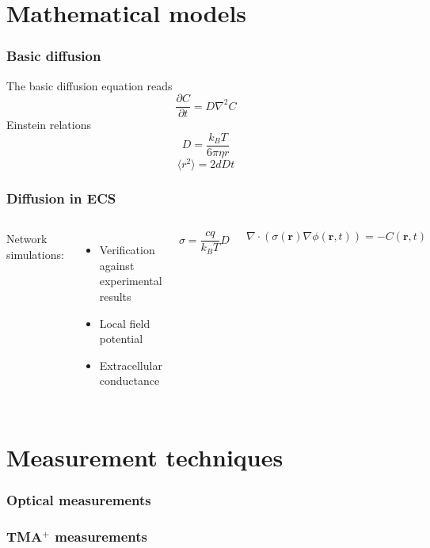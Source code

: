 \documentclass{beamer}
\renewcommand{\d}{\partial}
\begin{document}
\section{Mathematical models}

\begin{frame}
 \frametitle{Basic diffusion}
 The basic diffusion equation reads
 \begin{equation}
  \frac{\d C}{\d t} = D\nabla^2C
 \end{equation}
Einstein relations
\begin{equation}
 D = \frac{k_B T}{6\pi\eta r}
\end{equation}
\begin{equation}
 \langle r^2\rangle = 2dDt
\end{equation}
\end{frame}

\begin{frame}
 \frametitle{Diffusion in ECS}
\begin{columns} 
 \column{2.0in} 
 Network simulations: \\
 \begin{itemize}
  \item Verification against experimental results
  \item Local field potential
  \item Extracellular conductance
 \end{itemize}
 \begin{equation}
  \sigma = \frac{cq}{k_B T}D 
 \end{equation}
 
\column{2.0in}
\begin{equation*}
\nabla\cdot(\sigma(\mathbf{r})\nabla\phi(\mathbf{r},t)) = -C(\mathbf{r},t)
\end{equation*}

\end{columns}

\end{frame}


\section{Measurement techniques}
 \begin{frame}
 \frametitle{Optical measurements}
\end{frame}

 \begin{frame}
 \frametitle{TMA$^+$ measurements}
\end{frame}
\end{document}

